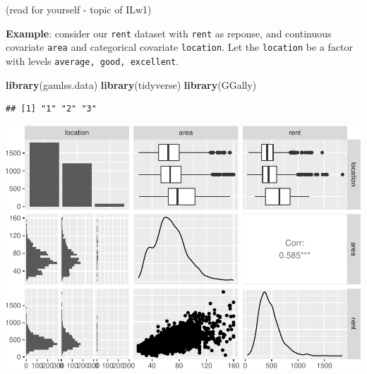 \documentclass[
]{article}
\newenvironment{Shaded}{\begin{snugshade}}{\end{snugshade}}
\newcommand{\CommentTok}[1]{\textcolor[rgb]{0.56,0.35,0.01}{\textit{#1}}}
\newcommand{\FunctionTok}[1]{\textcolor[rgb]{0.13,0.29,0.53}{\textbf{#1}}}
\newcommand{\NormalTok}[1]{#1}
\newcommand{\OtherTok}[1]{\textcolor[rgb]{0.56,0.35,0.01}{#1}}
\newcommand{\SpecialCharTok}[1]{\textcolor[rgb]{0.81,0.36,0.00}{\textbf{#1}}}
\newcommand{\StringTok}[1]{\textcolor[rgb]{0.31,0.60,0.02}{#1}}
\begin{document}
(read for yourself - topic of ILw1)

\textbf{Example}: consider our \texttt{rent} dataset with \texttt{rent}
as reponse, and continuous covariate \texttt{area} and categorical
covariate \texttt{location}. Let the \texttt{location} be a factor with
levels \texttt{average,\ good,\ excellent}.

\begin{Shaded}
\begin{Highlighting}[]
\FunctionTok{library}\NormalTok{(gamlss.data)}
\FunctionTok{library}\NormalTok{(tidyverse)}
\FunctionTok{library}\NormalTok{(GGally)}
\end{Highlighting}
\end{Shaded}

\begin{Shaded}
\end{Shaded}

\begin{verbatim}
## [1] "1" "2" "3"
\end{verbatim}

\begin{Shaded}
\end{Shaded}

\includegraphics{2MLR_files/figure-latex/unnamed-chunk-15-1.pdf}
\end{document}

